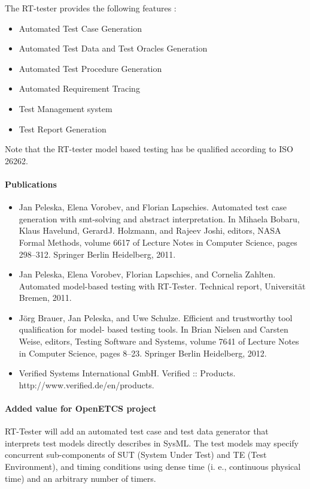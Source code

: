 The RT-tester provides the following features :
\begin{itemize}
\item Automated Test Case Generation 
\item Automated Test Data and Test Oracles Generation 
\item Automated Test Procedure Generation 
\item Automated Requirement Tracing 
\item Test Management system 
\item Test Report Generation
\end{itemize}


Note that the RT-tester model based testing has be qualified according
to ISO 26262.

\paragraph{Publications}

\begin{itemize}
\item Jan Peleska, Elena Vorobev, and Florian Lapschies. Automated test case generation with smt-solving
and abstract interpretation. In Mihaela Bobaru, Klaus Havelund, GerardJ. Holzmann, and Rajeev
Joshi, editors, NASA Formal Methods, volume 6617 of Lecture Notes in Computer Science, pages
298–312. Springer Berlin Heidelberg, 2011.
\item Jan Peleska, Elena Vorobev, Florian Lapschies, and Cornelia Zahlten. Automated model-based
testing with RT-Tester. Technical report, Universität Bremen, 2011.
\item Jörg Brauer, Jan Peleska, and Uwe Schulze. Efficient and trustworthy tool qualification for model-
based testing tools. In Brian Nielsen and Carsten Weise, editors, Testing Software and Systems,
volume 7641 of Lecture Notes in Computer Science, pages 8–23. Springer Berlin Heidelberg, 2012.
\item Verified Systems International GmbH. Verified :: Products. http://www.verified.de/en/products.


\end{itemize} 

\paragraph{Added value for OpenETCS project}

RT-Tester will add  an automated test case and test data generator
that interprets test models directly describes in SysML. 
The test models may specify concurrent sub-components of
SUT (System Under Test) and TE (Test Environment), and timing
conditions using dense time (i. e., continuous physical time) and 
an arbitrary number of timers. 


